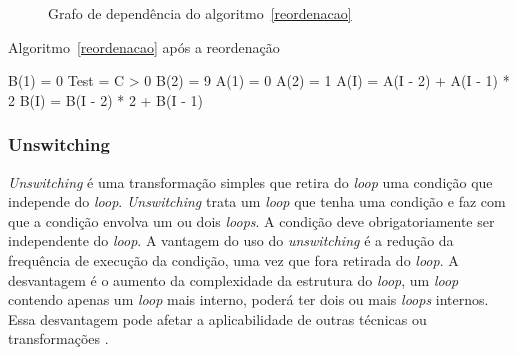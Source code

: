 \begin{figure}
\centering
\label{graph_statement_reordering}
\caption{Grafo de dependência do algoritmo~\ref{reordenacao}}
\end{figure}

\begin{algorithm}
\caption{Algoritmo~\ref{reordenacao} após a reordenação}
\label{reordenado}
\begin{algorithmic}[1]

\STATE B(1) = 0
\STATE Test = C > 0
 \STATE B(2) = 9 \ENDIF
\STATE A(1) = 0
 \STATE A(2) = 1 \ENDIF
{}
\STATE A(I) = A(I - 2) + A(I - 1) * 2
\STATE B(I) = B(I - 2) * 2 + B(I - 1) 
\ENDFOR

\end{algorithmic}
\end{algorithm}


\subsubsection{Unswitching}

\textit{Unswitching} é uma transformação simples que retira do \textit{loop} 
uma condição que independe do \textit{loop}. 
\textit{Unswitching} trata um \textit{loop} que tenha uma condição e faz com 
que a condição envolva um ou dois \textit{loops}. 
A condição deve obrigatoriamente ser independente do \textit{loop}.
A vantagem do uso do \textit{unswitching} é a redução da frequência de execução da 
condição, uma vez que fora retirada do \textit{loop}. 
A desvantagem é o aumento da complexidade da estrutura do \textit{loop}, 
um \textit{loop} contendo apenas um \textit{loop} mais interno,
poderá ter dois ou mais \textit{loops} internos. 
Essa desvantagem pode afetar a aplicabilidade de outras técnicas ou
transformações \cite{hpcfpc}.

